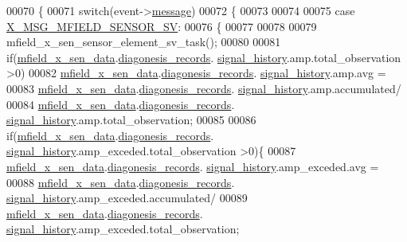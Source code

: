 \begin{DoxyCode}
00070 \{
00071     \textcolor{keywordflow}{switch}(event->\hyperlink{a00036_adf9665938515a20c283eea2c978cf80d}{message})
00072     \{
00073 
00074 
00075         \textcolor{keywordflow}{case} \hyperlink{a00025_a510020575747f82c587c5485b8619f78}{X\_MSG\_MFIELD\_SENSOR\_SV}:
00076         \{
00077 
00078 
00079             mfield\_x\_sen\_sensor\_element\_sv\_task();
00080 
00081             \textcolor{keywordflow}{if}(\hyperlink{a00052_af8c531b1ba5fea148fb9111e06058f92}{mfield\_x\_sen\_data}.\hyperlink{a00025_a2bd79ce84bbd6b7f50d38954f7ae475e}{diagonesis\_records}.
      \hyperlink{a00019_ab7038f4de1f77b52a7f89e9f77c0b846}{signal\_history}.amp.total\_observation >0)
00082                 \hyperlink{a00052_af8c531b1ba5fea148fb9111e06058f92}{mfield\_x\_sen\_data}.\hyperlink{a00025_a2bd79ce84bbd6b7f50d38954f7ae475e}{diagonesis\_records}.
      \hyperlink{a00019_ab7038f4de1f77b52a7f89e9f77c0b846}{signal\_history}.amp.avg =
00083                         \hyperlink{a00052_af8c531b1ba5fea148fb9111e06058f92}{mfield\_x\_sen\_data}.\hyperlink{a00025_a2bd79ce84bbd6b7f50d38954f7ae475e}{diagonesis\_records}.
      \hyperlink{a00019_ab7038f4de1f77b52a7f89e9f77c0b846}{signal\_history}.amp.accumulated/
00084                         \hyperlink{a00052_af8c531b1ba5fea148fb9111e06058f92}{mfield\_x\_sen\_data}.\hyperlink{a00025_a2bd79ce84bbd6b7f50d38954f7ae475e}{diagonesis\_records}.
      \hyperlink{a00019_ab7038f4de1f77b52a7f89e9f77c0b846}{signal\_history}.amp.total\_observation;
00085 
00086             \textcolor{keywordflow}{if}(\hyperlink{a00052_af8c531b1ba5fea148fb9111e06058f92}{mfield\_x\_sen\_data}.\hyperlink{a00025_a2bd79ce84bbd6b7f50d38954f7ae475e}{diagonesis\_records}.
      \hyperlink{a00019_ab7038f4de1f77b52a7f89e9f77c0b846}{signal\_history}.amp\_exceded.total\_observation >0)\{
00087                 \hyperlink{a00052_af8c531b1ba5fea148fb9111e06058f92}{mfield\_x\_sen\_data}.\hyperlink{a00025_a2bd79ce84bbd6b7f50d38954f7ae475e}{diagonesis\_records}.
      \hyperlink{a00019_ab7038f4de1f77b52a7f89e9f77c0b846}{signal\_history}.amp\_exceded.avg =
00088                         \hyperlink{a00052_af8c531b1ba5fea148fb9111e06058f92}{mfield\_x\_sen\_data}.\hyperlink{a00025_a2bd79ce84bbd6b7f50d38954f7ae475e}{diagonesis\_records}.
      \hyperlink{a00019_ab7038f4de1f77b52a7f89e9f77c0b846}{signal\_history}.amp\_exceded.accumulated/
00089                         \hyperlink{a00052_af8c531b1ba5fea148fb9111e06058f92}{mfield\_x\_sen\_data}.\hyperlink{a00025_a2bd79ce84bbd6b7f50d38954f7ae475e}{diagonesis\_records}.
      \hyperlink{a00019_ab7038f4de1f77b52a7f89e9f77c0b846}{signal\_history}.amp\_exceded.total\_observation;

\end{DoxyCode}
